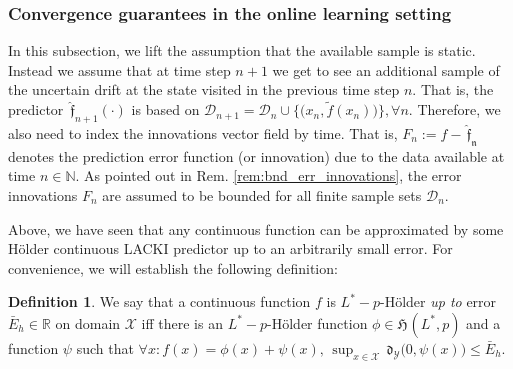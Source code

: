 \documentclass{article} %
\theoremstyle{definition}
\newtheorem{defn}[thm]{Definition}
\theoremstyle{remark}
\newcommand{\Real}{\mathbb R}
\newcommand{\nat}{\mathbb N}
\newcommand{\vc}[1]{#1}
\newcommand{\data}{\ensuremath{ \mathcal D} }
\newcommand{\state}{\ensuremath{ \vc x}} %
\newcommand{\inspace}{\ensuremath{ \mathcal X}}
\newcommand{\outspace}{\ensuremath{ \mathcal Y}}
\newcommand{\metric}{\, \mathfrak{d}} %
\newcommand{\predf}{\, \mathfrak{  \hat f}} %
\newcommand{\predfn}{\, \mathfrak{  \hat f_n}} %
\newcommand{\hoelset}[3]{\mathfrak{H}_{#2}(#1,#3)}
\begin{document}
\subsubsection{Convergence guarantees in the online learning setting}
In this subsection, we lift the assumption that the available sample is static. Instead we assume that at time step $n+1$ we get to see an additional sample of the uncertain drift at the state visited in the previous time step $n$. 
That is, the predictor $\predf_{n+1}(\cdot)$ is based on $\data_{n+1} = \data_n \cup \{ \bigl(\state_n, \tilde f(\state_n) \bigr)\}, \forall n $.
Therefore, we also need to index the innovations vector field by time. That is, $F_n := f - \predfn$ denotes the prediction error function (or innovation) due to the data available at time $n \in \nat$. 
As pointed out in Rem. \ref{rem:bnd_err_innovations}, the error innovations $F_n$ are assumed to be bounded for all finite sample sets $\data_n$. 




Above, we have seen that any continuous function can be approximated by some H\"older continuous LACKI predictor up to an arbitrarily small error. 
For convenience, we will establish the following definition:

\begin{defn}
We say that a continuous function $f$ is $L^*-p$-H\"older \emph{up to} error $\bar E_h \in \Real$ on domain $\inspace$ iff there is an $L^*-p$-H\"older function $\phi \in \hoelset {L^*} { } p$ and a function $\psi$ such that $\forall x: f(x) = \phi(x)+\psi(x), \, \sup_{x \in \inspace} \metric_\outspace\bigl(0,\psi(x)\bigr) \leq \bar E_h$.
\end{defn}
\end{document}
